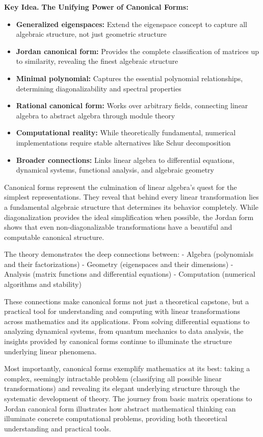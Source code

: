 \documentclass[12pt]{article}
\numberwithin{equation}{section}
\theoremstyle{plain}
\theoremstyle{definition}
\theoremstyle{remark}
\newenvironment{keyidea}{\begin{tcolorbox}\textbf{Key Idea.}}{\end{tcolorbox}}
\begin{document}
\begin{keyidea}
\textbf{The Unifying Power of Canonical Forms:}

\begin{itemize}
\item \textbf{Generalized eigenspaces:} Extend the eigenspace concept to capture all algebraic structure, not just geometric structure
\item \textbf{Jordan canonical form:} Provides the complete classification of matrices up to similarity, revealing the finest algebraic structure
\item \textbf{Minimal polynomial:} Captures the essential polynomial relationships, determining diagonalizability and spectral properties
\item \textbf{Rational canonical form:} Works over arbitrary fields, connecting linear algebra to abstract algebra through module theory
\item \textbf{Computational reality:} While theoretically fundamental, numerical implementations require stable alternatives like Schur decomposition
\item \textbf{Broader connections:} Links linear algebra to differential equations, dynamical systems, functional analysis, and algebraic geometry
\end{itemize}

Canonical forms represent the culmination of linear algebra's quest for the simplest representations. They reveal that behind every linear transformation lies a fundamental algebraic structure that determines its behavior completely. While diagonalization provides the ideal simplification when possible, the Jordan form shows that even non-diagonalizable transformations have a beautiful and computable canonical structure.

The theory demonstrates the deep connections between:
- Algebra (polynomials and their factorizations)
- Geometry (eigenspaces and their dimensions)  
- Analysis (matrix functions and differential equations)
- Computation (numerical algorithms and stability)

These connections make canonical forms not just a theoretical capstone, but a practical tool for understanding and computing with linear transformations across mathematics and its applications. From solving differential equations to analyzing dynamical systems, from quantum mechanics to data analysis, the insights provided by canonical forms continue to illuminate the structure underlying linear phenomena.

Most importantly, canonical forms exemplify mathematics at its best: taking a complex, seemingly intractable problem (classifying all possible linear transformations) and revealing its elegant underlying structure through the systematic development of theory. The journey from basic matrix operations to Jordan canonical form illustrates how abstract mathematical thinking can illuminate concrete computational problems, providing both theoretical understanding and practical tools.
\end{keyidea}
\end{document}
